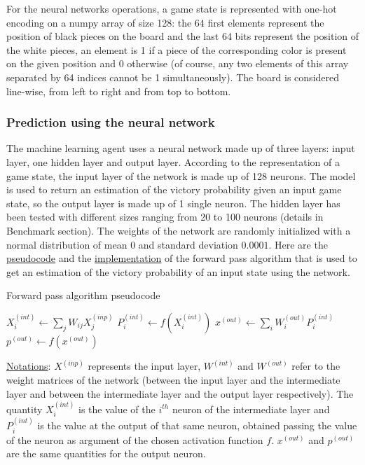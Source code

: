 \documentclass{article}
\begin{document}
For the neural networks operations, a game state is represented with one-hot encoding on a numpy array of size 128: the 64 first elements represent the position of black pieces on the board and the last 64 bits represent the position of the white pieces, an element is 1 if a piece of the corresponding color is present on the given position and 0 otherwise (of course, any two elements of this array separated by 64 indices cannot be 1 simultaneously). The board is considered line-wise, from left to right and from top to bottom.

\subsubsection{Prediction using the neural network}

The machine learning agent uses a neural network made up of three layers: input layer, one hidden layer and output layer. According to the representation of a game state, the input layer of the network is made up of 128 neurons. The model is used to return an estimation of the victory probability given an input game state, so the output layer is made up of 1 single neuron. The hidden layer has been tested with different sizes ranging from 20 to 100 neurons (details in Benchmark section). The weights of the network are randomly initialized with a normal distribution of mean $0$ and standard deviation $0.0001$. Here are the \hyperref[alg:fp-pseudo]{pseudocode} and the \hyperref[code:fp-code]{implementation} of the forward pass algorithm that is used to get an estimation of the victory probability of an input state using the network.

\begin{algorithm}[H]
	\caption{Forward pass algorithm pseudocode}
    \label{alg:fp-pseudo}
	\begin{algorithmic}[1]
		    \State $X_{i}^{(int)} \leftarrow \sum_{j}{W_{ij} X_{j}^{(inp)}}$
		    \State $P_{i}^{(int)} \leftarrow f(X_{i}^{(int)})$
		\EndFor
		\State $x^{(out)} \leftarrow \sum_{i}{W_{i}^{(out)}P_ {i}^{(int)}}$
		\State $p^{(out)} \leftarrow f(x^{(out)})$
	\end{algorithmic}
\end{algorithm}

\underline{Notations}: $X^{(inp)}$ represents the input layer, $W^{(int)}$ and $W^{(out)}$ refer to the weight matrices of the network (between the input layer and the intermediate layer and between the intermediate layer and the output layer respectively). The quantity $X_{i}^{(int)}$ is the value of the $i^{th}$ neuron of the intermediate layer and $P_{i}^{(int)}$ is the value at the output of that same neuron, obtained passing the value of the neuron as argument of the chosen activation function $f$. $x^{(out)}$ and $p^{(out)}$ are the same quantities for the output neuron.
\end{document}
